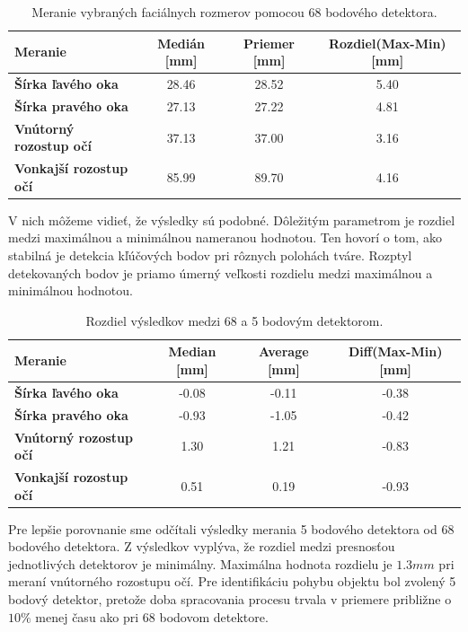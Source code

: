 \begin{table}[h]
	\caption{\label{tab:dlib:68points} Meranie vybraných faciálnych rozmerov pomocou 68 bodového detektora.}
	\centering
	\begin{tabular}{lccc}
		\toprule
		\textbf{Meranie} & \textbf{Medián [mm]} & \textbf{Priemer [mm]} & \textbf{Rozdiel(Max-Min) [mm]} \\ 
		\midrule
		\textbf{Šírka ľavého oka} 	& 28.46 & 28.52	& 5.40 \\
		\textbf{Šírka pravého oka} 	& 27.13	& 27.22 & 4.81 \\
		\textbf{Vnútorný rozostup očí} 	& 37.13	& 37.00 & 3.16 \\
		\textbf{Vonkajší rozostup očí} 	& 85.99	& 89.70 & 4.16 \\
		\bottomrule
	\end{tabular}
\end{table}

V nich môžeme vidieť, že výsledky sú podobné. Dôležitým parametrom je rozdiel medzi maximálnou a minimálnou nameranou hodnotou. Ten hovorí o tom, ako stabilná je detekcia kľúčových bodov pri rôznych polohách tváre. Rozptyl detekovaných bodov je priamo úmerný veľkosti rozdielu medzi maximálnou a minimálnou hodnotou.

\begin{table}[H]
	\caption{\label{tab:dlib:resulrs} Rozdiel výsledkov medzi 68 a 5 bodovým detektorom.}
	\centering
	\begin{tabular}{lccc}
		\toprule
		\textbf{Meranie} & \textbf{Median [mm]} & \textbf{Average [mm]} & \textbf{Diff(Max-Min) [mm]} \\ 
		\midrule
		\textbf{Šírka ľavého oka} 	& -0.08 & -0.11	& -0.38 \\
		\textbf{Šírka pravého oka} 	& -0.93	& -1.05 & -0.42 \\
		\textbf{Vnútorný rozostup očí} 	& 1.30	& 1.21 & -0.83 \\
		\textbf{Vonkajší rozostup očí} 	& 0.51	& 0.19 & -0.93 \\
		\bottomrule
	\end{tabular}
\end{table}

Pre lepšie porovnanie sme odčítali výsledky merania 5 bodového detektora od 68 bodového detektora. Z výsledkov vyplýva, že rozdiel medzi presnosťou jednotlivých detektorov je minimálny. Maximálna hodnota rozdielu je $1.3mm$ pri meraní vnútorného rozostupu očí.
Pre identifikáciu pohybu objektu bol zvolený 5 bodový detektor, pretože doba spracovania procesu trvala v priemere približne o $ 10\% $ menej času ako pri 68 bodovom detektore.  

